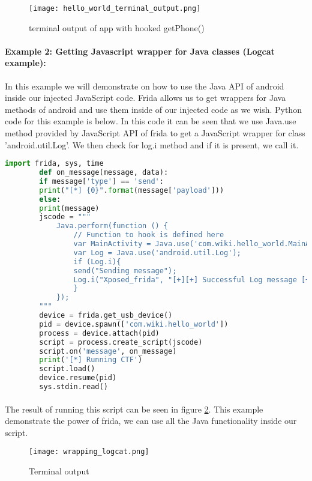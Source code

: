 \documentclass[../main.tex]{subfile}
\begin{document}
\begin{figure}[H]
	\texttt{[image: hello\_world\_terminal\_output.png]}
	\caption{terminal output of app with hooked getPhone()}
	\label{fig:hello_world_terminal_hooked}
\end{figure}
	
	
	
	\paragraph{Example 2: Getting Javascript wrapper for Java classes (Logcat example):} In this example we will demonstrate on how to use the Java API of android inside our injected JavaScript code. Frida allows us to get wrappers for Java methods of android and use them inside of our injected code as we wish. Python code for this example is below. In this code it can be seen that we use Java.use method provided by JavaScript API of frida to get a JavaScript wrapper for class 'android.util.Log'. We then check for log.i method and if it is present, we call it.
	\begin{lstlisting}[language=python]
		import frida, sys, time
		def on_message(message, data):
		if message['type'] == 'send':
		print("[*] {0}".format(message['payload']))
		else:
		print(message)
		jscode = """
			Java.perform(function () {
				// Function to hook is defined here
				var MainActivity = Java.use('com.wiki.hello_world.MainActivity');
				var Log = Java.use('android.util.Log');
				if (Log.i){
				send("Sending message");
				Log.i("Xposed_frida", "[+][+] Successful Log message [+][+]");
				}
			});
		"""
		device = frida.get_usb_device()
		pid = device.spawn(['com.wiki.hello_world'])
		process = device.attach(pid)
		script = process.create_script(jscode)
		script.on('message', on_message)
		print('[*] Running CTF')
		script.load()
		device.resume(pid)
		sys.stdin.read()
	\end{lstlisting}
	
	\paragraph{} The result of running this script can be seen in figure \ref{fig:wrapping_logcat}. This example demonstrate the power of frida, we can use all the Java functionality inside our script.
	\begin{figure}[H]
		\texttt{[image: wrapping\_logcat.png]}
		\caption{Terminal output }
		\label{fig:wrapping_logcat}
	\end{figure}
	
\end{document}
